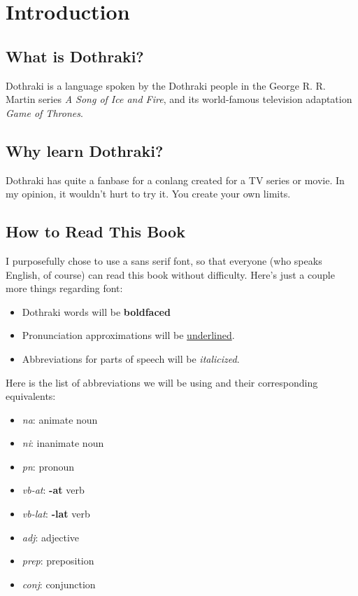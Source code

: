\chapter*{Introduction}
\section*{What is Dothraki?}
Dothraki is a language spoken by the Dothraki people in the George R. R. Martin
series \textit{A Song of Ice and Fire}, and its world-famous television adaptation
\textit{Game of Thrones}.
\section*{Why learn Dothraki?}
Dothraki has quite a fanbase for a conlang created for a TV series or movie. In my
opinion, it wouldn't hurt to try it. You create your own limits.
\section*{How to Read This Book}
I purposefully chose to use a sans serif font, so that everyone (who speaks English,
of course) can read this book without difficulty. Here's just a couple more things regarding font:
\begin{itemize}
	\item Dothraki words will be \textbf{boldfaced}
	\item Pronunciation approximations will be \underline{underlined}.
	\item Abbreviations for parts of speech will be \textit{italicized}.
\end{itemize}
Here is the list of abbreviations we will be using and their corresponding equivalents:
\begin{itemize}
	\item \textit{na}: animate noun
	\item \textit{ni}: inanimate noun
	\item \textit{pn}: pronoun
	\item \textit{vb-at}: \textbf{-at} verb
  \item \textit{vb-lat}: \textbf{-lat} verb
	\item \textit{adj}: adjective
 	\item \textit{prep}: preposition
	\item \textit{conj}: conjunction
\end{itemize}
